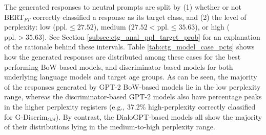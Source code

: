     
    
    
    



The generated responses to neutral prompts are split by (1) whether or not BERT$_{FT}$ correctly classified a response as its target class, and (2) the level of perplexity: low ($\text{ppl.} \leq 27.52$), medium ($27.52 < \text{ppl.} \leq 35.63$), or high ($\text{ppl.} > 35.63$). See Section \ref{subsec:ctg_anal_ppl_target_prob} for an explanation of the rationale behind these intervals. Table \ref{tab:ctg_model_case_pcts} shows how the generated responses are distributed among these cases for the best performing BoW-based models, and discriminator-based models for both underlying language models and target age groups. As can be seen, the majority of the responses generated by GPT-2 BoW-based models lie in the low perplexity range, whereas the discriminator-based GPT-2 models also have percentage peaks in the higher perplexity registers (e.g., 37.2\% high-perplexity correctly classified for G-Discrim$_{Old}$). By contrast, the DialoGPT-based models all show the majority of their distributions lying in the medium-to-high perplexity range.

